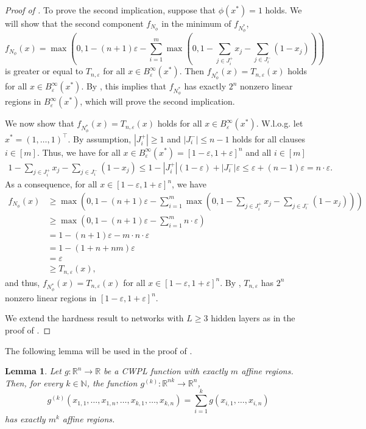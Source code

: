 \documentclass{article}
\newtheorem{lemma}[theorem]{Lemma}
\begin{document}
\begin{proof}[Proof of ]
To prove the second implication, suppose that $\phi(x^*)=1$ holds.
We will show that the second component $f_{N_\phi}$ in the minimum of $f_{N_\phi^*}$,
\[
f_{N_\phi}(x)=\max(0, 1-(n+1)\varepsilon-\sum_{i=1}^m \max(0, 1-\sum_{j\in J^+_i}x_j-\sum_{j\in J^-_i}(1-x_j)))
\]
is greater or equal to $T_{n,\varepsilon}$ for all $x\in B^\infty_\varepsilon(x^*)$. Then $f_{N_\phi^*}(x)=T_{n,\varepsilon}(x)$ holds for all $x\in B^\infty_\varepsilon(x^*)$. By , this implies that $f_{N_\phi^*}$ has exactly $2^n$ nonzero linear regions in $B^\infty_\varepsilon(x^*)$, which will prove the second implication.

We now show that $f_{N_\phi^*}(x)=T_{n,\varepsilon}(x)$ holds for all $x\in B^\infty_\varepsilon(x^*)$.
W.l.o.g. let $x^*=(1,\dots, 1)^\top$.
By assumption, $|J^+_i|\geq 1$ and $|J^-_i|\leq n-1$ holds for all clauses $i\in[m]$.
Thus, we have for all $x\in B^\infty_\varepsilon(x^*)=[1-\varepsilon,1+\varepsilon]^n$ and all $i\in [m]$
\begin{align*}
    1-\sum_{j\in J^+_i}x_j-\sum_{j\in J^-_i}(1-x_j)
    \leq 1-|J^+_i|(1-\varepsilon)+|J^-_i|\varepsilon
    \leq  \varepsilon+(n-1)\varepsilon
    = n\cdot \varepsilon.
\end{align*}
As a consequence, for all $x\in [1-\varepsilon,1+\varepsilon]^n$, we have
\begin{align*}
    f_{N_\phi}(x)
    &\geq \max(0, 1-(n+1)\varepsilon-\sum_{i=1}^m \max(0, 1-\sum_{j\in J^+_i}x_j-\sum_{j\in J^-_i}(1-x_j)))\\
    &\geq \max(0, 1-(n+1)\varepsilon-\sum_{i=1}^m n\cdot \varepsilon)\\
    &= 1-(n+1)\varepsilon-m \cdot n\cdot \varepsilon\\
    &= 1-(1+n+nm)\varepsilon\\
    &= \varepsilon\\
    &\geq T_{n,\varepsilon}(x),
\end{align*}
and thus, $f_{N_\phi^*}(x)=T_{n,\varepsilon}(x)$ for all $x\in [1-\varepsilon,1+\varepsilon]^n$.
By , $T_{n,\varepsilon}$ has $2^n$ nonzero linear regions in $[1-\varepsilon,1+\varepsilon]^n$.

We extend the hardness result to networks with $L\geq 3$ hidden layers as in the proof of .
\end{proof}
The following lemma will be used in the proof of .
\begin{lemma}
\label{lem:amplification_lemma}
Let $g:\mathbb{R}^n\to \mathbb{R}$ be a CWPL function with exactly $m$ affine regions. Then, for every $k\in \mathbb{N}$, the function $g^{(k)}:\mathbb{R}^{nk}\to \mathbb{R}^n$,
\[
g^{(k)}(x_{1,1},\dots, x_{1,n},\dots,x_{k,1},\dots, x_{k,n})=\sum_{i=1}^k g(x_{i,1},\dots, x_{i,n})
\]
has exactly $m^k$ affine regions.
\end{lemma}
\end{document}
